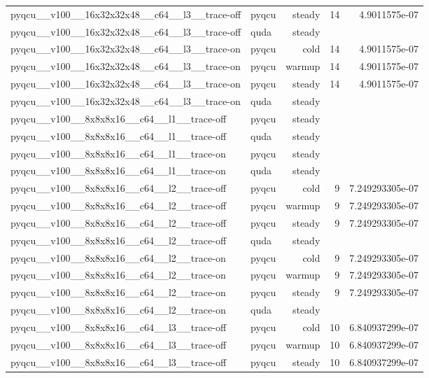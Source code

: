 \begin{table}[htbp]
\begin{tabular}{@{}llrrr@{}}
pyqcu\_\_v100\_\_16x32x32x48\_\_c64\_\_l3\_\_trace-off & pyqcu & steady & 14 & 4.9011575e-07 \\
pyqcu\_\_v100\_\_16x32x32x48\_\_c64\_\_l3\_\_trace-off & quda & steady &  &  \\
pyqcu\_\_v100\_\_16x32x32x48\_\_c64\_\_l3\_\_trace-on & pyqcu & cold & 14 & 4.9011575e-07 \\
pyqcu\_\_v100\_\_16x32x32x48\_\_c64\_\_l3\_\_trace-on & pyqcu & warmup & 14 & 4.9011575e-07 \\
pyqcu\_\_v100\_\_16x32x32x48\_\_c64\_\_l3\_\_trace-on & pyqcu & steady & 14 & 4.9011575e-07 \\
pyqcu\_\_v100\_\_16x32x32x48\_\_c64\_\_l3\_\_trace-on & quda & steady &  &  \\
pyqcu\_\_v100\_\_8x8x8x16\_\_c64\_\_l1\_\_trace-off & pyqcu & steady &  &  \\
pyqcu\_\_v100\_\_8x8x8x16\_\_c64\_\_l1\_\_trace-off & quda & steady &  &  \\
pyqcu\_\_v100\_\_8x8x8x16\_\_c64\_\_l1\_\_trace-on & pyqcu & steady &  &  \\
pyqcu\_\_v100\_\_8x8x8x16\_\_c64\_\_l1\_\_trace-on & quda & steady &  &  \\
pyqcu\_\_v100\_\_8x8x8x16\_\_c64\_\_l2\_\_trace-off & pyqcu & cold & 9 & 7.249293305e-07 \\
pyqcu\_\_v100\_\_8x8x8x16\_\_c64\_\_l2\_\_trace-off & pyqcu & warmup & 9 & 7.249293305e-07 \\
pyqcu\_\_v100\_\_8x8x8x16\_\_c64\_\_l2\_\_trace-off & pyqcu & steady & 9 & 7.249293305e-07 \\
pyqcu\_\_v100\_\_8x8x8x16\_\_c64\_\_l2\_\_trace-off & quda & steady &  &  \\
pyqcu\_\_v100\_\_8x8x8x16\_\_c64\_\_l2\_\_trace-on & pyqcu & cold & 9 & 7.249293305e-07 \\
pyqcu\_\_v100\_\_8x8x8x16\_\_c64\_\_l2\_\_trace-on & pyqcu & warmup & 9 & 7.249293305e-07 \\
pyqcu\_\_v100\_\_8x8x8x16\_\_c64\_\_l2\_\_trace-on & pyqcu & steady & 9 & 7.249293305e-07 \\
pyqcu\_\_v100\_\_8x8x8x16\_\_c64\_\_l2\_\_trace-on & quda & steady &  &  \\
pyqcu\_\_v100\_\_8x8x8x16\_\_c64\_\_l3\_\_trace-off & pyqcu & cold & 10 & 6.840937299e-07 \\
pyqcu\_\_v100\_\_8x8x8x16\_\_c64\_\_l3\_\_trace-off & pyqcu & warmup & 10 & 6.840937299e-07 \\
pyqcu\_\_v100\_\_8x8x8x16\_\_c64\_\_l3\_\_trace-off & pyqcu & steady & 10 & 6.840937299e-07 \\

\end{tabular}
\end{table}
